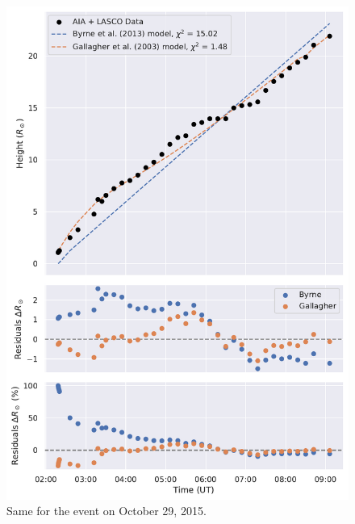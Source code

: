 \begin{figure}[!htp]
	\centering
	\includegraphics[width=0.8\hsize]{chapter2/figs/appendix/height_profile_residuals_aia_lasco_151029_01.pdf}
	\caption{Same for the event on October 29, 2015.}
\end{figure}

